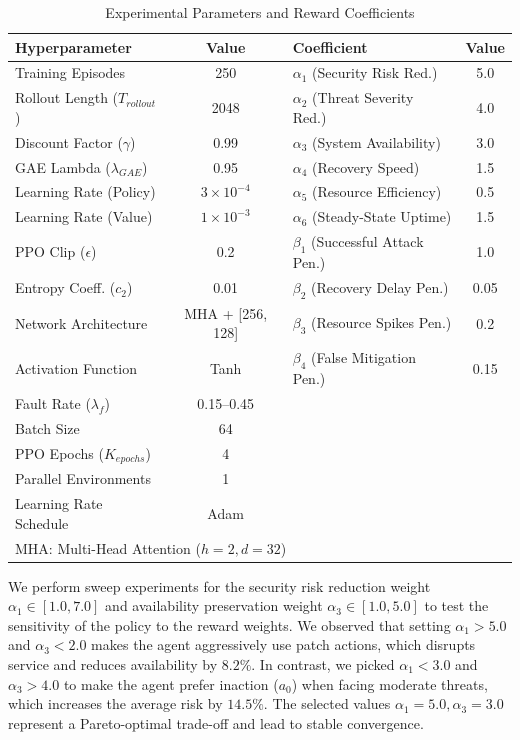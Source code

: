 \documentclass[conference,10pt]{IEEEtran}
\begin{document}
\begin{table}[!t]
	\centering
	\caption{Experimental Parameters and Reward Coefficients}
	\label{tab:parameters}
	\scriptsize
	\setlength{\tabcolsep}{2.5pt}
	\begin{tabular}{@{}lc|lc@{}}
		\toprule
		\textbf{Hyperparameter} & \textbf{Value} & \textbf{Coefficient} & \textbf{Value} \\
		\midrule
		Training Episodes & 250 & $\alpha_1$ (Security Risk Red.) & 5.0 \\
		Rollout Length ($T_{rollout}$) & 2048 & $\alpha_2$ (Threat Severity Red.) & 4.0 \\
		Discount Factor ($\gamma$) & 0.99 & $\alpha_3$ (System Availability) & 3.0 \\
		GAE Lambda ($\lambda_{GAE}$) & 0.95 & $\alpha_4$ (Recovery Speed) & 1.5 \\
		Learning Rate (Policy) & $3 \times 10^{-4}$ & $\alpha_5$ (Resource Efficiency) & 0.5 \\
		Learning Rate (Value) & $1 \times 10^{-3}$ & $\alpha_6$ (Steady-State Uptime) & 1.5 \\
		PPO Clip ($\epsilon$) & 0.2 & $\beta_1$ (Successful Attack Pen.) & 1.0 \\
		Entropy Coeff. ($c_2$) & 0.01 & $\beta_2$ (Recovery Delay Pen.) & 0.05 \\
		Network Architecture & MHA + [256, 128] & $\beta_3$ (Resource Spikes Pen.) & 0.2 \\
		Activation Function & Tanh & $\beta_4$ (False Mitigation Pen.) & 0.15 \\
		Fault Rate ($\lambda_f$) & 0.15--0.45 & & \\
		Batch Size & 64 & & \\
		PPO Epochs ($K_{epochs}$) & 4 & & \\
		Parallel Environments & 1 & & \\
		Learning Rate Schedule & Adam & & \\
		\bottomrule
		\multicolumn{4}{l}{\scriptsize *MHA: Multi-Head Attention ($h=2, d=32$)}
	\end{tabular}
\end{table}

We perform sweep experiments for the security risk reduction weight $\alpha_1 \in [1.0, 7.0]$ and availability preservation weight $\alpha_3 \in [1.0, 5.0]$ to test the sensitivity of the policy to the reward weights. We observed that setting $\alpha_1 > 5.0$ and $\alpha_3 < 2.0$ makes the agent aggressively use patch actions, which disrupts service and reduces availability by $8.2\%$. In contrast, we picked $\alpha_1 < 3.0$ and $\alpha_3 > 4.0$ to make the agent prefer inaction ($a_0$) when facing moderate threats, which increases the average risk by $14.5\%$. The selected values $\alpha_1=5.0, \alpha_3=3.0$ represent a Pareto-optimal trade-off and lead to stable convergence. 
\end{document}

